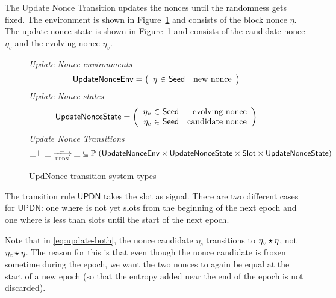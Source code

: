 The Update Nonce Transition updates the nonces until the randomness gets fixed.
The environment is shown in Figure~\ref{fig:ts-types:updnonce} and consists of
the block nonce $\eta$.
The update nonce state is shown in Figure~\ref{fig:ts-types:updnonce} and consists of
the candidate nonce $\eta_c$ and the evolving nonce $\eta_v$.

\begin{figure}
  \emph{Update Nonce environments}
  \begin{equation*}
    \UpdateNonceEnv =
    \left(
      \begin{array}{r@{~\in~}lr}
        \eta & \Seed & \text{new nonce} \\
      \end{array}
    \right)
  \end{equation*}
  \emph{Update Nonce states}
  \begin{equation*}
    \UpdateNonceState =
    \left(
      \begin{array}{r@{~\in~}lr}
        \eta_v & \Seed & \text{evolving nonce} \\
        \eta_c & \Seed & \text{candidate nonce} \\
      \end{array}
    \right)
  \end{equation*}
  \emph{Update Nonce Transitions}
  \begin{equation*}
    \_ \vdash \var{\_} \trans{updn}{\_} \var{\_} \subseteq
    \powerset (\UpdateNonceEnv
               \times \UpdateNonceState
               \times \Slot
               \times \UpdateNonceState
              )
  \end{equation*}
  \caption{UpdNonce transition-system types}
  \label{fig:ts-types:updnonce}
\end{figure}

The transition rule $\mathsf{UPDN}$ takes the slot  as signal. There are
two different cases for $\mathsf{UPDN}$: one where  is not yet
\StabilityWindow{} slots from the beginning of the next epoch and one where
 is less than \StabilityWindow{} slots until the start of the next epoch.

Note that in \ref{eq:update-both}, the nonce candidate $\eta_c$ transitions to
$\eta_v\star\eta$, not $\eta_c\star\eta$. The reason for this is that even
though the nonce candidate is frozen sometime during the epoch, we want the two
nonces to again be equal at the start of a new epoch (so that the entropy added
near the end of the epoch is not discarded).

